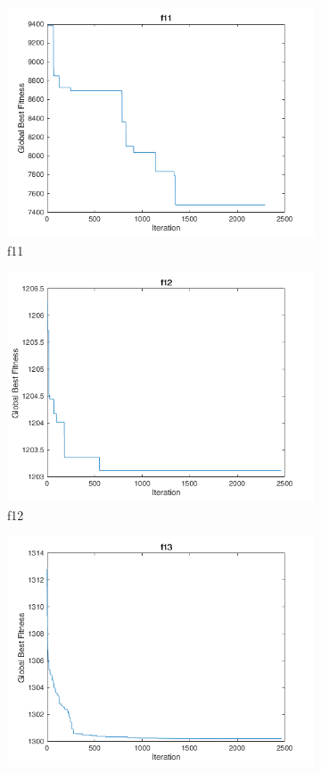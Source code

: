 \begin{figure}
\begin{subfigure}[b]{0.4\textwidth}
    \includegraphics[width=\textwidth]{img/cecrt/f11}
    \caption{f11}
  \end{subfigure}
  \begin{subfigure}[b]{0.4\textwidth}
    \includegraphics[width=\textwidth]{img/cecrt/f12}
    \caption{f12}
  \end{subfigure}
  \begin{subfigure}[b]{0.4\textwidth}
    \includegraphics[width=\textwidth]{img/cecrt/f13}

\end{subfigure}
\end{figure}
